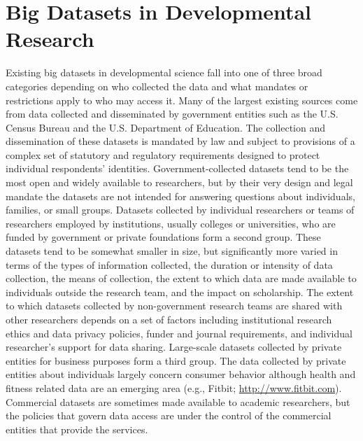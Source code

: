 \documentclass[letterpaper,man,apacite,natbib]{apa6}
\begin{document}
\section{Big Datasets in Developmental Research}
Existing big datasets in developmental science fall into one of three broad categories depending on who collected the data and what mandates or restrictions apply to who may access it.
Many of the largest existing sources come from data collected and disseminated by government entities such as the U.S. Census Bureau and the U.S. Department of Education.
The collection and dissemination of these datasets is mandated by law and subject to provisions of a complex set of statutory and regulatory requirements designed to protect individual respondents' identities.
Government-collected datasets tend to be the most open and widely available to researchers, but by their very design and legal mandate the datasets are not intended for answering questions about individuals, families, or small groups.
Datasets collected by individual researchers or teams of researchers employed by institutions, usually colleges or universities, who are funded by government or private foundations form a second group.
These datasets tend to be somewhat smaller in size, but significantly more varied in terms of the types of information collected, the duration or intensity of data collection, the means of collection, the extent to which data are made available to individuals outside the research team, and the impact on scholarship.
The extent to which datasets collected by non-government research teams are shared with other researchers depends on a set of factors including institutional research ethics and data privacy policies, funder and journal requirements, and individual researcher's support for data sharing.
Large-scale datasets collected by private entities for business purposes form a third group.
The data collected by private entities about individuals largely concern consumer behavior although health and fitness related data are an emerging area (e.g., Fitbit; \url{http://www.fitbit.com}).  
Commercial datasets are sometimes made available to academic researchers, but the policies that govern data access are under the control of the commercial entities that provide the services.
\end{document}
